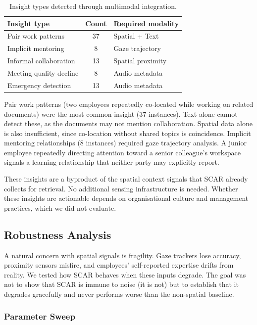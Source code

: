 \documentclass[journal]{IEEEtran}
\begin{document}
\begin{table}[htbp]
\centering
\caption{Insight types detected through multimodal integration.}
\label{tab:multimodal}
\begin{tabular}{lcp{3.5cm}}
\hline
\textbf{Insight type} & \textbf{Count} & \textbf{Required modality} \\
\hline
Pair work patterns         & 37 & Spatial + Text \\
Implicit mentoring         & 8  & Gaze trajectory \\
Informal collaboration     & 13 & Spatial proximity \\
Meeting quality decline     & 8  & Audio metadata \\
Emergency detection        & 13 & Audio metadata \\
\hline
\end{tabular}
\end{table}

Pair work patterns (two employees repeatedly co-located while working on related documents) were the most common insight (37 instances). Text alone cannot detect these, as the documents may not mention collaboration. Spatial data alone is also insufficient, since co-location without shared topics is coincidence. Implicit mentoring relationships (8 instances) required gaze trajectory analysis. A junior employee repeatedly directing attention toward a senior colleague's workspace signals a learning relationship that neither party may explicitly report.

These insights are a byproduct of the spatial context signals that SCAR already collects for retrieval. No additional sensing infrastructure is needed. Whether these insights are actionable depends on organisational culture and management practices, which we did not evaluate.

\subsection{Robustness Analysis}
\label{subsec:robustness}

A natural concern with spatial signals is fragility. Gaze trackers lose accuracy, proximity sensors misfire, and employees' self-reported expertise drifts from reality. We tested how SCAR behaves when these inputs degrade. The goal was not to show that SCAR is immune to noise (it is not) but to establish that it degrades gracefully and never performs worse than the non-spatial baseline.

\subsubsection{Parameter Sweep}
\end{document}
